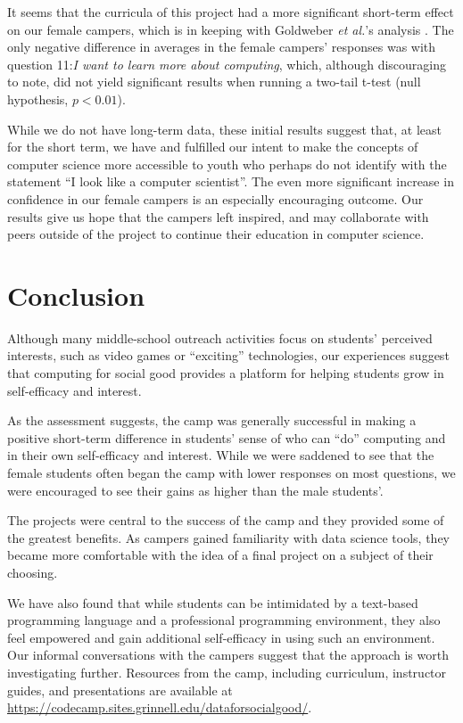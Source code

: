 It seems that the curricula of this project had a more significant
short-term effect on our female campers, which is in keeping with Goldweber
\textit{et al.}'s analysis \cite{Goldweber2013}.  The only negative
difference in averages in the female campers' responses was with
question 11:\textit{I want to learn more about computing}, which,
although discouraging to note, did not yield significant results
when running a two-tail t-test (null hypothesis, $p < 0.01$).

While we do not have long-term data, these initial results suggest
that, at least for the short term, we have and fulfilled our intent
to make the concepts of computer science more accessible to youth
who perhaps do not identify with the statement ``I look like a
computer scientist''. The even more significant increase in confidence
in our female campers is an especially encouraging outcome. Our
results give us hope that the campers left inspired, and may
collaborate with peers outside of the project to continue their
education in computer science.

\section{Conclusion}

Although many middle-school outreach activities focus on students'
perceived interests, such as video games or ``exciting'' technologies,
our experiences suggest that computing for social good
provides a platform for helping students grow in self-efficacy and
interest.

As the assessment suggests, the camp was generally successful in
making a positive short-term difference in students' sense of who
can ``do'' computing and in their own self-efficacy and interest.
While we were saddened to see that the female students often began
the camp with lower responses on most questions, we were encouraged
to see their gains as higher than the male students'.

The projects were central to the success of the camp and they
provided some of the greatest benefits.  As campers gained
familiarity with data science tools, they became more comfortable
with the idea of a final project on a subject of their choosing.

We have also found that while students can be intimidated by a
text-based programming language and a professional programming
environment, they also feel empowered and gain additional self-efficacy
in using such an environment.  Our informal conversations with the
campers suggest that the approach is worth investigating further.
Resources from the camp, including curriculum, instructor guides,
and presentations are available at \url{https://codecamp.sites.grinnell.edu/dataforsocialgood/}.
